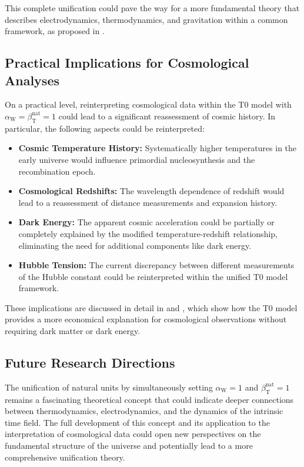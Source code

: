 \documentclass[12pt,a4paper]{article}
\newcommand{\betaT}{\beta_{\text{T}}}
\newcommand{\alphaW}{\alpha_{\text{W}}}
\begin{document}
	This complete unification could pave the way for a more fundamental theory that describes electrodynamics, thermodynamics, and gravitation within a common framework, as proposed in \cite{pascher_vereinheitlichung_2025}.
	
	\subsection{Practical Implications for Cosmological Analyses}
	\label{subsec:practical_implications}
	
	On a practical level, reinterpreting cosmological data within the T0 model with \(\alphaW = \betaT^{\text{nat}} = 1\) could lead to a significant reassessment of cosmic history. In particular, the following aspects could be reinterpreted:
	
	\begin{itemize}
		\item \textbf{Cosmic Temperature History:} Systematically higher temperatures in the early universe would influence primordial nucleosynthesis and the recombination epoch.
		\item \textbf{Cosmological Redshifts:} The wavelength dependence of redshift would lead to a reassessment of distance measurements and expansion history.
		\item \textbf{Dark Energy:} The apparent cosmic acceleration could be partially or completely explained by the modified temperature-redshift relationship, eliminating the need for additional components like dark energy.
		\item \textbf{Hubble Tension:} The current discrepancy between different measurements of the Hubble constant could be reinterpreted within the unified T0 model framework.
	\end{itemize}
	
	These implications are discussed in detail in \cite{pascher_messdifferenzen_2025} and \cite{pascher_galaxies_2025}, which show how the T0 model provides a more economical explanation for cosmological observations without requiring dark matter or dark energy.
	
	\subsection{Future Research Directions}
	\label{subsec:future_research_directions}
	
	The unification of natural units by simultaneously setting \(\alphaW = 1\) and \(\betaT^{\text{nat}} = 1\) remains a fascinating theoretical concept that could indicate deeper connections between thermodynamics, electrodynamics, and the dynamics of the intrinsic time field. The full development of this concept and its application to the interpretation of cosmological data could open new perspectives on the fundamental structure of the universe and potentially lead to a more comprehensive unification theory.
	
\end{document}
